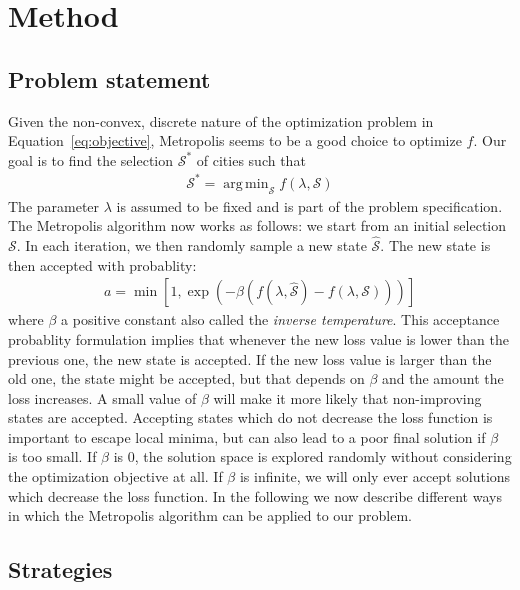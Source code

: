 \documentclass[conference,compsoc]{IEEEtran}
\newcommand{\selected}{\mathcal{S}} \newcommand{\newselected}{\hat{\mathcal{S}}}
\DeclareMathOperator*{\argmin}{arg\,min}
\begin{document}
\section{Method}
\label{sec:method}

\subsection{Problem statement}
Given the non-convex, discrete nature of the optimization problem in
Equation~\ref{eq:objective}, Metropolis seems to be a good choice to optimize
$f$. Our goal is to find the selection $\selected^*$ of cities such that
\begin{align}
    \selected^* = \argmin_{\selected} f(\lambda, \selected)
\end{align}
The parameter $\lambda$ is assumed to be fixed and is part of the problem
specification. The Metropolis algorithm now works as follows: we start from an
initial selection $\selected$. In each iteration, we then randomly sample a new
state $\newselected$. The new state is then accepted with probablity:
\begin{align}
    a = \min \left[1, \exp(-\beta (f(\lambda, \newselected) - f(\lambda, \selected))) \right]
\end{align}
where $\beta$ a positive constant also called the \emph{inverse temperature}.
This acceptance probablity formulation implies that whenever the new loss value
is lower than the previous one, the new state is accepted. If the new loss value
is larger than the old one, the state might be accepted, but that depends on
$\beta$ and the amount the loss increases. A small value of $\beta$ will make it
more likely that non-improving states are accepted. Accepting states which do
not decrease the loss function is important to escape local minima, but can also
lead to a poor final solution if $\beta$ is too small. If $\beta$ is 0, the
solution space is explored randomly without considering the optimization
objective at all. If $\beta$ is infinite, we will only ever accept solutions
which decrease the loss function. In the following we now describe different
ways in which the Metropolis algorithm can be applied to our problem.

\subsection{Strategies}
\label{subsec: strategies}
\end{document}
